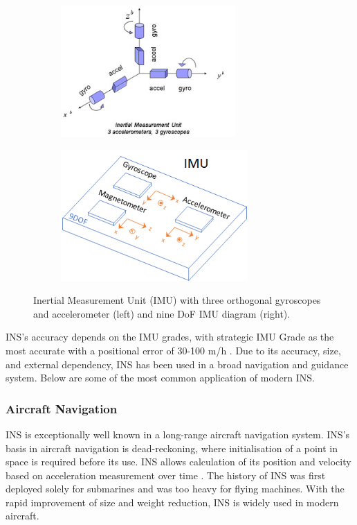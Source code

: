 \begin{figure}[!ht]
\centering
%    
  \begin{subfigure}[b]{0.45\textwidth}
    \includegraphics[height=5cm]{Figures/imu_6dof.jpg}
  \end{subfigure}
%
  \begin{subfigure}[b]{0.45\textwidth}
    \includegraphics[height=5cm]{Figures/imu_diagram.png}
  \end{subfigure}
%  
  \caption{Inertial Measurement Unit (IMU) with three orthogonal gyroscopes and accelerometer \cite{2021InertialTracking} (left) and nine DoF IMU diagram \cite{2021ModelSimulink} (right).}
    \label{fig:DoF}
\end{figure}


\noindent INS's accuracy depends on the IMU grades, with strategic IMU Grade as the most accurate with a positional error of 30-100 m/h \cite{El-Sheimy2020InertialTrends}. Due to its accuracy, size, and external dependency, INS has been used in a broad navigation and guidance system. Below are some of the most common application of modern INS.\\

\subsubsection{Aircraft Navigation}
INS is exceptionally well known in a long-range aircraft navigation system. INS's basis in aircraft navigation is dead-reckoning, where initialisation of a point in space is required before its use. INS allows calculation of its position and velocity based on acceleration measurement over time \cite{El-Sheimy2020InertialTrends}\cite{Loewy2003AircraftAvionics}. The history of INS was first deployed solely for submarines and was too heavy for flying machines. With the rapid improvement of size and weight reduction, INS is widely used in modern aircraft.\\

